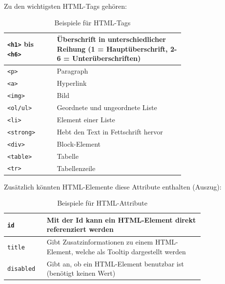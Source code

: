 Zu den wichtigsten HTML-Tags gehören: \cite{HTML-Tags}

\begin{table}[H]
    \centering
    \begin{tabular}{|l|p{0.72\linewidth}|}
        \hline
        \lstinline|<h1>| bis \lstinline|<h6>| & Überschrift in unterschiedlicher Reihung (1 = Hauptüberschrift, 2-6 = Unterüberschriften) \\ \hline
        \lstinline|<p>|                            & Paragraph                                                                                 \\ \hline
        \lstinline|<a>|                            & Hyperlink                                                                                 \\ \hline
        \lstinline|<img>|                            & Bild                                                                                      \\ \hline
        \lstinline|<ol/ul>|                            & Geordnete und ungeordnete Liste                                                           \\ \hline
        \lstinline|<li>|                            & Element einer Liste                                                                       \\ \hline
        \lstinline|<strong>|                            & Hebt den Text in Fettschrift hervor                                                       \\ \hline
        \lstinline|<div>|                            & Block-Element                                                                             \\ \hline
        \lstinline|<table>|                           & Tabelle                                                                                   \\ \hline
        \lstinline|<tr>|                           & Tabellenzeile                                                                             \\ \hline
    \end{tabular}
    \caption{Beispiele für HTML-Tags}
\end{table}

Zusätzlich könnten HTML-Elemente diese Attribute enthalten (Auszug):

\begin{table}[H]
    \centering
    \begin{tabular}{|l|p{0.8\linewidth}|}
        \hline
        \lstinline|id| & Mit der Id kann ein HTML-Element direkt referenziert werden                           \\ \hline
        \lstinline|title| & Gibt Zusatzinformationen zu einem HTML-Element, welche als Tooltip dargestellt werden \\ \hline
        \lstinline|disabled| & Gibt an, ob ein HTML-Element benutzbar ist (benötigt keinen Wert)                    \\ \hline
    \end{tabular}
    \caption{Beispiele für HTML-Attribute}
\end{table}


